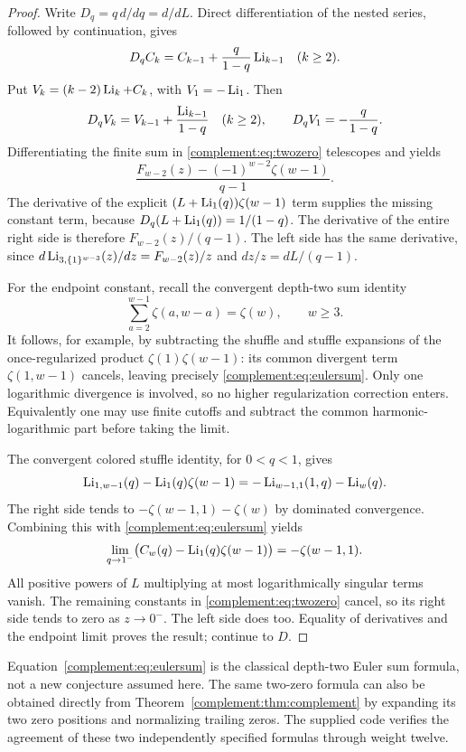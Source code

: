 \begin{proof}
Write $D_q=q\,d/dq=d/dL$. Direct differentiation of the nested series,
followed by continuation, gives
\[
 D_qC_k=C_{k-1}+\frac{q}{1-q}\operatorname{Li}_{k-1}\quad(k\ge2).
\]
Put $V_k=(k-2)\operatorname{Li}_k+C_k$, with $V_1=-\operatorname{Li}_1$.
Then
\[
 D_qV_k=V_{k-1}+\frac{\operatorname{Li}_{k-1}}{1-q}\quad(k\ge2),
 \qquad D_qV_1=-\frac{q}{1-q}.
\]
Differentiating the finite sum in \eqref{complement:eq:twozero} telescopes and yields
\[
 \frac{F_{w-2}(z)-(-1)^{w-2}\zeta(w-1)}{q-1}.
\]
The derivative of the explicit $(L+\operatorname{Li}_1(q))\zeta(w-1)$ term supplies
the missing constant term, because
$D_q(L+\operatorname{Li}_1(q))=1/(1-q)$.
The derivative of the entire right side is therefore
$F_{w-2}(z)/(q-1)$.
The left side has the same derivative, since
$d\operatorname{Li}_{3,\{1\}^{w-3}}(z)/dz=F_{w-2}(z)/z$ and
$dz/z=dL/(q-1)$.

For the endpoint constant, recall the convergent depth-two sum identity
\begin{equation}\label{complement:eq:eulersum}
 \sum_{a=2}^{w-1}\zeta(a,w-a)=\zeta(w),\qquad w\ge3.
\end{equation}
It follows, for example, by subtracting the shuffle and stuffle
expansions of the once-regularized product $\zeta(1)\zeta(w-1)$:
its common divergent term $\zeta(1,w-1)$ cancels, leaving precisely
\eqref{complement:eq:eulersum}. Only one logarithmic divergence is involved, so
no higher regularization correction enters. Equivalently one may use
finite cutoffs and subtract the common harmonic-logarithmic part
before taking the limit.

The convergent colored stuffle identity, for $0<q<1$, gives
\[
 \operatorname{Li}_{1,w-1}(q)-\operatorname{Li}_1(q)\zeta(w-1)
 =-\operatorname{Li}_{w-1,1}(1,q)-\operatorname{Li}_w(q).
\]
The right side tends to $-\zeta(w-1,1)-\zeta(w)$ by dominated
convergence. Combining this with \eqref{complement:eq:eulersum} yields
\[
 \lim_{q\to1^-}\bigl(C_w(q)-\operatorname{Li}_1(q)\zeta(w-1)\bigr)
 =-\zeta(w-1,1).
\]
All positive powers of $L$ multiplying at most logarithmically singular
terms vanish. The remaining constants in \eqref{complement:eq:twozero} cancel,
so its right side tends to zero as $z\to0^-$. The left side does too.
Equality of derivatives and the endpoint limit proves the result;
continue to $D$.
\end{proof}

\begin{remark}
Equation~\eqref{complement:eq:eulersum} is the classical depth-two Euler sum
formula, not a new conjecture assumed here. The same two-zero formula
can also be obtained directly from Theorem~\ref{complement:thm:complement} by
expanding its two zero positions and normalizing trailing zeros.
The supplied code verifies the agreement of these two independently
specified formulas through weight twelve.
\end{remark}


